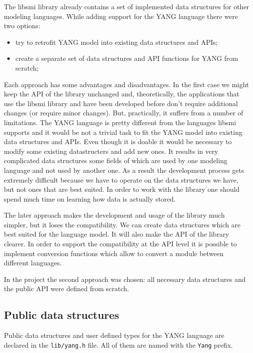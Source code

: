 \documentclass[conference]{IEEEtran}
\begin{document}
The libsmi library already contains a set of implemented data structures for other modeling languages. While adding support for the YANG language there were two options:
\begin{itemize}
\item try to retrofit YANG model into existing data structures and APIs;
\item create a separate set of data structures and API functions for YANG from scratch;
\end{itemize}

Each approach has some advantages and disadvantages. In the first case we might keep the API of the library unchanged and, theoretically, the applications that use the libsmi library and have been developed before don't require additional changes (or require minor changes). But, practically, it suffers from a number of limitations. The YANG language is pretty different from the languages libsmi supports and it would be not a trivial task to fit the YANG model into existing data structures and APIs. Even though it is doable it would be necessary to modify some existing datastructers and add new ones. It results in very complicated data structures some fields of which are used by one modeling language and not used by another one. As a result the development process gets extremely difficult because we have to operate on the data structures we have, but not ones that are best suited. In order to work with the library one should spend much time on learning how  data is actually stored. 

The later approach makes the development and usage of the library much simpler, but it loses the compatibility. We can create data structures which are best suited for the language model. It will also make the API of the library clearer. In order to support the compatibility at the API level it is possible to implement conversion functions which allow to convert a module between different languages. 

In the project the second approach was chosen: all necessary data structures and the public API were defined from scratch.

\subsection{Public data structures}
Public data structures and user defined types for the YANG language are declared in the \texttt{lib/yang.h} file. All of them are named with the \texttt{Yang} prefix. 
\end{document}
